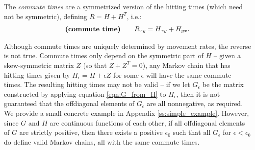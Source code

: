 \documentclass{article}
\begin{document}
The \emph{commute times} are a symmetrized version of the hitting times
(which need not be symmetric),
defining $R = H + H^T$, i.e.:
\begin{align} \label{eqn:R_from_H}
\text{\bf (commute time)} \qquad
    R_{xy} = H_{xy} + H_{yx}.
\end{align}

Although commute times are uniquely determined by movement rates, the reverse is not true.
Commute times only depend on the symmetric part of $H$ --
given a skew-symmetric matrix $Z$ (so that $Z + Z^T = 0$),
any Markov chain that has hitting times given by $H_\epsilon = H + \epsilon Z$ for some $\epsilon$
will have the same commute times.
The resulting hitting times may not be valid --
if we let $G_\epsilon$ be the matrix constructed by applying equation \eqref{eqn:G_from_H} to $H_\epsilon$,
then it is not guaranteed that the offdiagonal elements of $G_\epsilon$ are all nonnegative, as required.
We provide a small concrete example in Appendix \ref{ss:simple_example}.
However, since $G$ and $H$ are continuous functions of each other,
if all offdiagonal elements of $G$ are strictly positive,
then there exists a positive $\epsilon_0$ such that all $G_\epsilon$ for $\epsilon < \epsilon_0$
do define valid Markov chains, all with the same commute times.
\end{document}
